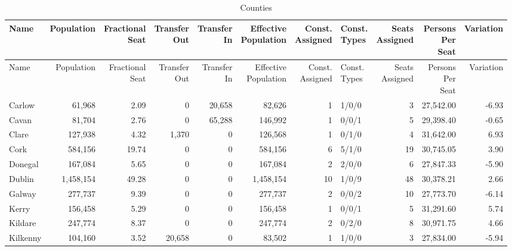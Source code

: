 \documentclass[a4paper]{article}
\begin{document}
\begin{longtable}{lrrrrrrlrrr}
\caption{Counties}
\\ \toprule
Name &Population &\shortstack{Fractional\\Seat} &\shortstack{Transfer\\Out} &\shortstack{Transfer\\In} &\shortstack{Effective\\Population} &\shortstack{Const.\\Assigned} &\shortstack{Const.\\Types} &\shortstack{Seats\\Assigned} &\shortstack{Persons\\Per\\Seat} &Variation \\ \midrule
\endfirsthead
\toprule
Name &Population &\shortstack{Fractional\\Seat} &\shortstack{Transfer\\Out} &\shortstack{Transfer\\In} &\shortstack{Effective\\Population} &\shortstack{Const.\\Assigned} &\shortstack{Const.\\Types} &\shortstack{Seats\\Assigned} &\shortstack{Persons\\Per\\Seat} &Variation \\ \midrule
\endhead
\bottomrule
\endfoot
Carlow&61,968& 2.09&0&20,658&82,626&1&1/0/0&3&27,542.00&-6.93\\ 
Cavan&81,704& 2.76&0&65,288&146,992&1&0/0/1&5&29,398.40&-0.65\\ 
Clare&127,938& 4.32&1,370&0&126,568&1&0/1/0&4&31,642.00& 6.93\\ 
Cork&584,156&19.74&0&0&584,156&6&5/1/0&19&30,745.05& 3.90\\ 
Donegal&167,084& 5.65&0&0&167,084&2&2/0/0&6&27,847.33&-5.90\\ 
Dublin&1,458,154&49.28&0&0&1,458,154&10&1/0/9&48&30,378.21& 2.66\\ 
Galway&277,737& 9.39&0&0&277,737&2&0/0/2&10&27,773.70&-6.14\\ 
Kerry&156,458& 5.29&0&0&156,458&1&0/0/1&5&31,291.60& 5.74\\ 
Kildare&247,774& 8.37&0&0&247,774&2&0/2/0&8&30,971.75& 4.66\\ 
Kilkenny&104,160& 3.52&20,658&0&83,502&1&1/0/0&3&27,834.00&-5.94\\ 

\end{longtable}
\end{document}
